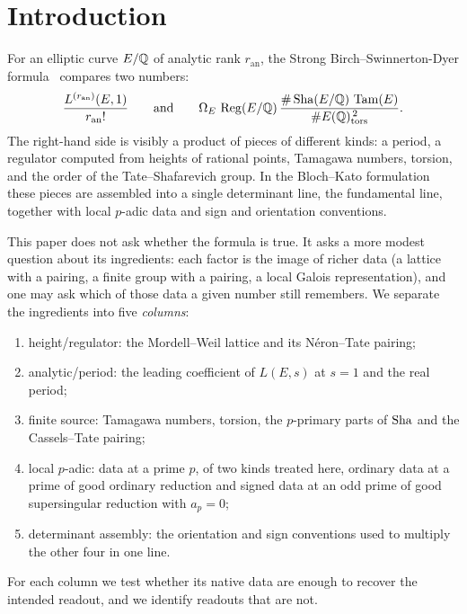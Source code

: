 \section{Introduction}\label{sec:introduction}

For an elliptic curve $E/\mathbb{Q}$ of analytic rank $r_{\mathrm{an}}$, the
Strong Birch--Swinnerton-Dyer
formula~\citep{BirchSwinnertonDyer1965,Tate1966bsd} compares two numbers:
\[
  \frac{L^{(r_{\mathrm{an}})}(E,1)}{r_{\mathrm{an}}!}
  \qquad\text{and}\qquad
  \Omega_E\,\operatorname{Reg}(E/\mathbb{Q})\,
  \frac{\#\operatorname{Sha}(E/\mathbb{Q})\,\operatorname{Tam}(E)}{\#E(\mathbb{Q})_{\operatorname{tors}}^{\,2}} .
\]
The right-hand side is visibly a product of pieces of different kinds: a
period, a regulator computed from heights of rational points, Tamagawa
numbers, torsion, and the order of the Tate--Shafarevich group.  In the
Bloch--Kato formulation~\citep{BlochKato1990,FontainePerrinRiou1994} these
pieces are assembled into a single determinant line, the fundamental
line, together with local $p$-adic data and sign and orientation
conventions.

This paper does not ask whether the formula is true.  It asks a more
modest question about its ingredients: each factor is the image of richer
data (a lattice with a pairing, a finite group with a pairing, a local
Galois representation), and one may ask which of those data a given
number still remembers.  We separate the ingredients into five
\emph{columns}:
\begin{enumerate}
\item height/regulator: the Mordell--Weil lattice and its N\'eron--Tate
  pairing;
\item analytic/period: the leading coefficient of $L(E,s)$ at $s=1$ and the
  real period;
\item finite source: Tamagawa numbers, torsion, the $p$-primary parts of
  $\operatorname{Sha}$ and the Cassels--Tate pairing;
\item local $p$-adic: data at a prime $p$, of two kinds treated here,
  ordinary data at a prime of good ordinary reduction and signed data at an
  odd prime of good supersingular reduction with $a_p=0$;
\item determinant assembly: the orientation and sign conventions used to
  multiply the other four in one line.
\end{enumerate}
For each column we test whether its native data are enough to recover the
intended readout, and we identify readouts that are not.

